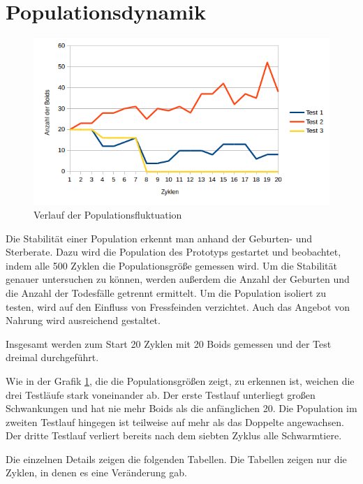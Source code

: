 \documentclass[draft=false
              ,paper=a4
              ,twoside=false
              ,fontsize=11pt
              ,headsepline
              ,BCOR10mm
              ,DIV11
              ,bibtotoc
              ,liststotoc
              ]{scrbook}
\begin{document}
\section{Populationsdynamik}
\begin{figure}[h]
\centering
\includegraphics[scale=0.8]{project/Test1-Populationen.png}
\caption{Verlauf der Populationsfluktuation}
\label{populationsgrafik}
\end{figure}

Die Stabilität einer Population erkennt man anhand der Geburten- und Sterberate. Dazu wird die Population des Prototyps gestartet und beobachtet, indem alle 500 Zyklen die Populationsgröße gemessen wird. Um die Stabilität genauer untersuchen zu können, werden außerdem die Anzahl der Geburten und die Anzahl der Todesfälle getrennt ermittelt. Um die Population isoliert zu testen, wird auf den Einfluss von Fressfeinden verzichtet. Auch das Angebot von Nahrung wird ausreichend gestaltet.

Insgesamt werden zum Start 20 Zyklen mit 20 Boids gemessen und der Test dreimal durchgeführt.

Wie in der Grafik \ref{populationsgrafik}, die die Populationsgrößen zeigt, zu erkennen ist, weichen die drei Testläufe stark voneinander ab. Der erste Testlauf unterliegt großen Schwankungen und hat nie mehr Boids als die anfänglichen 20. Die Population im zweiten Testlauf hingegen ist teilweise auf mehr als das Doppelte angewachsen. Der dritte Testlauf verliert bereits nach dem siebten Zyklus alle Schwarmtiere.

Die einzelnen Details zeigen die folgenden Tabellen. Die Tabellen zeigen nur die Zyklen, in denen es eine Veränderung gab.
\end{document}
